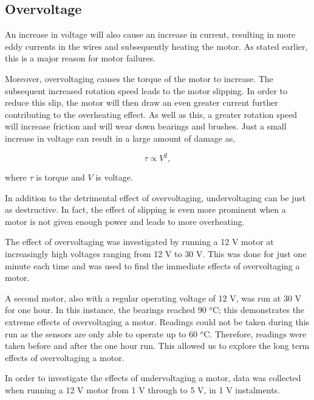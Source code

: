 

\subsection{Overvoltage}

An increase in voltage will also cause an increase in current, resulting in more eddy currents in the wires and subsequently heating the motor. As stated earlier, this is a major reason for motor failures. 

Moreover, overvoltaging causes the torque of the motor to increase. The subsequent increased rotation speed leads to the motor %
slipping. In order to reduce this slip, the motor will then draw an even greater current further contributing to the overheating effect. As well as this, a greater rotation speed will increase friction and will wear down bearings and brushes. Just a small increase in voltage can result in a large amount of damage as,

\begin{equation}
\tau \propto V^2,
\label{Torque}
\end{equation}

where $\tau$ is torque and $V$ is voltage.

In addition to the detrimental effect of overvoltaging, undervoltaging can be just as destructive. In fact, the effect of slipping is even more prominent when a motor is not given enough power and leads to more overheating.


The effect of overvoltaging  was investigated by running a 12 V motor at increasingly high voltages ranging from 12 V to 30 V. This was done for just one minute each time and was used to find the immediate effects of overvoltaging a motor.
    

A second motor, also with a regular operating voltage of 12 V, was run at 30 V for one hour. In this instance, the bearings reached 90 $^o$C; this demonstrates the extreme effects of overvoltaging a motor. Readings could not be taken during this run as the sensors are only able to operate %
up to 60 $^o$C. %
Therefore, readings were taken before and after the one hour run. This allowed us to explore the long term effects of overvoltaging a motor.


In order to investigate the effects of undervoltaging a motor, data was collected when running a 12 V motor from 1 V through to 5 V, in 1 V instalments. 

